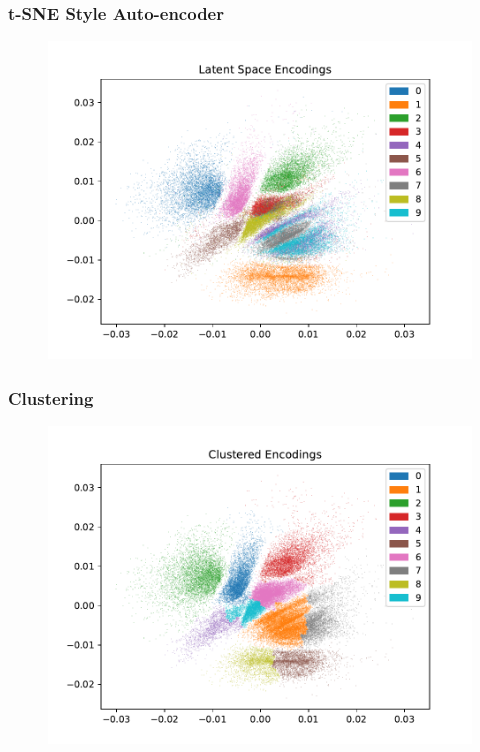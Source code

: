 \documentclass[10pt, usenames, dvipsnames, table]{beamer}
\begin{document}
\begin{frame}
  \frametitle{t-SNE Style Auto-encoder}
  \begin{figure}
    \centering
    \includegraphics[width=\linewidth]
    {models/mnist_student_e300_L2_b64/encodings}
    \caption{}
    \label{}
  \end{figure}
\end{frame}

\begin{frame}
  \frametitle{Clustering}
  \begin{figure}
    \centering
    \includegraphics[width=\linewidth]
    {models/mnist_student_e300_L2_b64/multi-normal-cluster_clustered_encodings}
    \caption{}
    \label{}
  \end{figure}
\end{frame}
\end{document}
